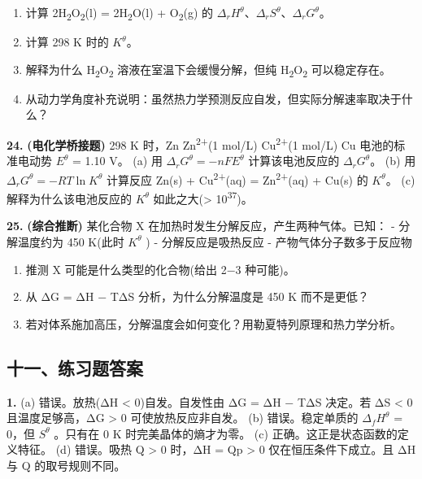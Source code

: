 \begin{enumerate}
\def\labelenumi{(\alph{enumi})}
\tightlist
\item
  计算 2H\textsubscript{2}O\textsubscript{2}(l) = 2H\textsubscript{2}O(l) + O\textsubscript{2}(g) 的 \(\Delta_r H^\theta\)、\(\Delta_r S^\theta\)、\(\Delta_r G^\theta\)。
\item
  计算 298 K 时的 \(K^\theta\)。
\item
  解释为什么 H\textsubscript{2}O\textsubscript{2} 溶液在室温下会缓慢分解，但纯 H\textsubscript{2}O\textsubscript{2} 可以稳定存在。
\item
  从动力学角度补充说明：虽然热力学预测反应自发，但实际分解速率取决于什么？
\end{enumerate}

\textbf{24.} \textbf{(电化学桥接题)} 298 K 时，Zn \textbar{} Zn\textsuperscript{2+}(1 mol/L) \textbar\textbar{} Cu\textsuperscript{2+}(1 mol/L) \textbar{} Cu 电池的标准电动势 \(E^\theta\) = 1.10 V。
(a) 用 \(\Delta_r G^\theta = -nFE^\theta\) 计算该电池反应的 \(\Delta_r G^\theta\)。
(b) 用 \(\Delta_r G^\theta = -RT \ln K^\theta\) 计算反应 Zn(s) + Cu\textsuperscript{2+}(aq) = Zn\textsuperscript{2+}(aq) + Cu(s) 的 \(K^\theta\)。
(c) 解释为什么该电池反应的 \(K^\theta\) 如此之大(\textgreater{} 10\textsuperscript{37})。

\textbf{25.} \textbf{(综合推断)} 某化合物 X 在加热时发生分解反应，产生两种气体。已知：
- 分解温度约为 450 K(此时 \(K^\theta\) )
- 分解反应是吸热反应
- 产物气体分子数多于反应物

\begin{enumerate}
\def\labelenumi{(\alph{enumi})}
\tightlist
\item
  推测 X 可能是什么类型的化合物(给出 2−3 种可能)。
\item
  从 ΔG = ΔH − TΔS 分析，为什么分解温度是 450 K 而不是更低？
\item
  若对体系施加高压，分解温度会如何变化？用勒夏特列原理和热力学分析。
\end{enumerate}

\subsection{十一、练习题答案}\label{ux5341ux4e00ux7ec3ux4e60ux9898ux7b54ux6848}

\textbf{1.}
(a) 错误。放热(ΔH \textless{} 0) 自发。自发性由 ΔG = ΔH − TΔS 决定。若 ΔS \textless{} 0 且温度足够高，ΔG \textgreater{} 0 可使放热反应非自发。
(b) 错误。稳定单质的 \(\Delta_f H^\theta\) = 0，但 \(S^\theta\) 。只有在 0 K 时完美晶体的熵才为零。
(c) 正确。这正是状态函数的定义特征。
(d) 错误。吸热 Q \textgreater{} 0 时，ΔH = Qp \textgreater{} 0 仅在恒压条件下成立。且 ΔH 与 Q 的取号规则不同。

